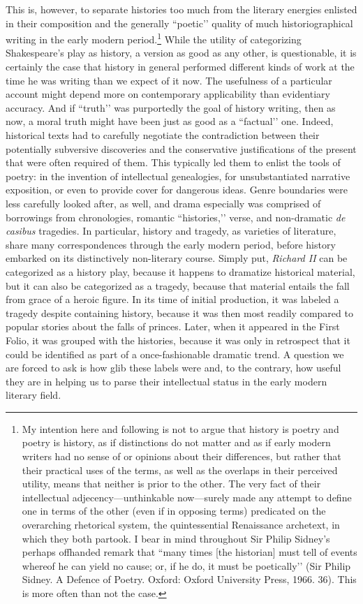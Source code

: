 This is, however, to separate histories too much from the literary energies enlisted in their composition and the generally ``poetic’’ quality of much historiographical writing in the early modern period.\footnote{My intention here and following is not to argue that history is poetry and poetry is history, as if distinctions do not matter and as if early modern writers had no sense of or opinions about their differences, but rather that their practical uses of the terms, as well as the overlaps in their perceived utility, means that neither is prior to the other.
The very fact of their intellectual adjecency---unthinkable now---surely made any attempt to define one in terms of the other (even if in opposing terms) predicated on the overarching rhetorical system, the quintessential Renaissance archetext, in which they both partook.
I bear in mind throughout Sir Philip Sidney’s perhaps offhanded remark that ``many times [the historian] must tell of events whereof he can yield no cause; or, if he do, it must be poetically’’ (Sir Philip Sidney. A Defence of Poetry. Oxford: Oxford University Press, 1966. 36). This is more often than not the case.} While the utility of categorizing Shakespeare’s play as history, a version as good as any other, is questionable, it is certainly the case that history in general performed different kinds of work at the time he was writing than we expect of it now.
The usefulness of a particular account might depend more on contemporary applicability than evidentiary accuracy.
And if ``truth’’ was purportedly the goal of history writing, then as now, a moral truth might have been just as good as a ``factual’’ one.
Indeed, historical texts had to carefully negotiate the contradiction between their potentially subversive discoveries and the conservative justifications of the present that were often required of them.
This typically led them to enlist the tools of poetry: in the invention of intellectual genealogies, for unsubstantiated narrative exposition, or even to provide cover for dangerous ideas.
Genre boundaries were less carefully looked after, as well, and drama especially was comprised of borrowings from chronologies, romantic ``histories,’’ verse, and non-dramatic \emph{de casibus} tragedies.
In particular, history and tragedy, as varieties of literature, share many correspondences through the early modern period, before history embarked on its distinctively non-literary course.
Simply put, \emph{Richard II} can be categorized as a history play, because it happens to dramatize historical material, but it can also be categorized as a tragedy, because that material entails the fall from grace of a heroic figure.
In its time of initial production, it was labeled a tragedy despite containing history, because it was then most readily compared to popular stories about the falls of princes.
Later, when it appeared in the First Folio, it was grouped with the histories, because it was only in retrospect that it could be identified as part of a once-fashionable dramatic trend.
A question we are forced to ask is how glib these labels were and, to the contrary, how useful they are in helping us to parse their intellectual status in the early modern literary field.

